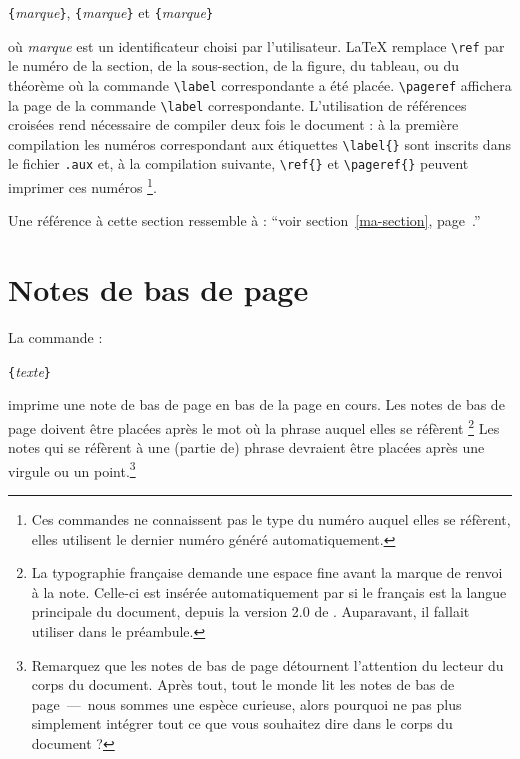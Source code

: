 \begin{lscommand}
\verb|{|\emph{marque}\verb|}|, \verb|{|\emph{marque}\verb|}|
et \verb|{|\emph{marque}\verb|}|
\end{lscommand}
\noindent où \emph{marque} est un identificateur choisi par
l'utilisateur. \LaTeX{} remplace \verb|\ref| par le numéro de la
section, de la sous-section, de la figure, du tableau, ou du théorème
où la commande \verb|\label| correspondante a été
placée. \verb|\pageref| affichera la page de la commande \verb|\label|
correspondante.
L'utilisation de références croisées rend nécessaire de compiler deux fois le
document : à la première compilation les numéros correspondant aux étiquettes
\verb|\label{}| sont inscrits dans le fichier \texttt{.aux} et, à la
compilation suivante, \verb|\ref{}| et \verb|\pageref{}| peuvent imprimer
ces numéros%
\footnote{Ces commandes ne connaissent pas le type du numéro auquel
elles se réfèrent, elles utilisent le dernier numéro généré
automatiquement.}.

\begin{example}
Une référence à cette
section\label{ma-section}
ressemble à :
\enquote{voir section~\ref{ma-section},
page~\pageref{ma-section}.}
\end{example}

\section{Notes de bas de page}
La commande :
\begin{lscommand}
\verb|{|\emph{texte}\verb|}|
\end{lscommand}
\noindent imprime une note de bas de page en bas de la page en cours.
Les notes de bas de page doivent être placées après le mot où la
phrase auquel elles se réfèrent%
\footnote{La typographie française demande une espace fine avant la
marque de renvoi à la note. Celle-ci est insérée automatiquement par
 si le français est la langue principale du document, depuis la
version 2.0 de . Auparavant, il fallait utiliser
 dans le préambule. \NdT}
Les notes qui se réfèrent à une (partie de) phrase devraient être
placées après une virgule ou un point.\footnote{Remarquez que les
  notes de bas de page détournent l'attention du lecteur du corps du
  document. Après tout, tout le monde lit les notes de bas de
  page~---~nous sommes une espèce curieuse, alors pourquoi ne pas plus
  simplement intégrer tout ce que vous souhaitez dire dans le corps du
  document ?\footnotemark}
\nopagebreak[2]

